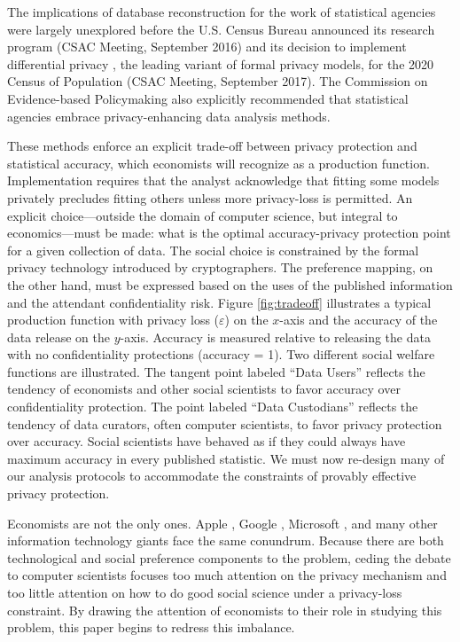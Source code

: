 \documentclass[finalmode,PP]{AEA}
\begin{document}
The implications of database reconstruction for the work of statistical agencies were largely unexplored before the U.S. Census Bureau announced its research program (\ac{CSAC} Meeting, September 2016) and its decision to implement differential privacy \citep{Dwork2006a}, the leading variant of formal privacy models, for the 2020 Census of Population (\ac{CSAC} Meeting, September 2017). The Commission on Evidence-based Policymaking \citeyearpar{cep:promise:2017} also explicitly recommended that statistical agencies embrace privacy-enhancing data analysis methods.



These methods enforce an explicit trade-off between privacy protection and statistical accuracy, which economists will recognize as a production function. Implementation requires that the analyst acknowledge that fitting some models privately precludes fitting others unless more privacy-loss is permitted.
An explicit choice---outside the domain of computer science, but integral to economics---must be made: what is the optimal accuracy-privacy protection point for a given collection of data. The social choice is constrained by the formal privacy technology introduced by cryptographers. The preference mapping, on the other hand, must be expressed based on the uses of the published information and the attendant confidentiality risk.
Figure \ref{fig:tradeoff} illustrates a typical production function with privacy loss ($\varepsilon$) on the $x$-axis and the accuracy of the data release on the $y$-axis. Accuracy is measured relative to releasing the data with no confidentiality protections (accuracy = 1). Two different social welfare functions are illustrated. The tangent point labeled ``Data Users'' reflects the tendency of economists and other social scientists to favor accuracy over confidentiality protection. The point labeled ``Data Custodians'' reflects the tendency of data curators, often computer scientists, to favor privacy protection over accuracy. Social scientists have behaved as if they could always have maximum accuracy in every published statistic. We must now re-design many of our analysis protocols to accommodate the constraints of provably effective privacy protection.


Economists are not the only ones. Apple \citep{Apple:Learning:2017}, Google \citep{Erlingsson2014},  Microsoft \citep{Ding:Telemetry:NIPS:2017}, and many other information technology giants face the same conundrum. Because there are both technological and social preference components to the problem, ceding the debate to computer scientists focuses too much attention on the privacy mechanism and too little attention on how to do good social science under a privacy-loss constraint. By drawing the attention of economists to their role in studying this problem, this paper begins to redress this imbalance.
\end{document}

